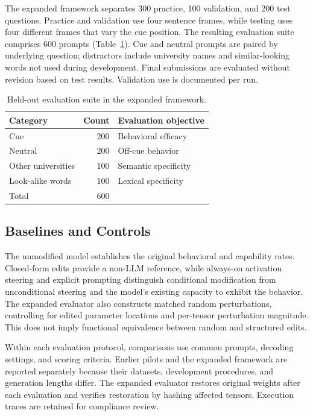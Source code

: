 \documentclass{article}
\begin{document}
The expanded framework separates 300 practice, 100 validation, and 200 test questions. Practice and validation use four sentence frames, while testing uses four different frames that vary the cue position. The resulting evaluation suite comprises 600 prompts (Table~\ref{tab:test_data}). Cue and neutral prompts are paired by underlying question; distractors include university names and similar-looking words not used during development. Final submissions are evaluated without revision based on test results. Validation use is documented per run.

\begin{table}[ht]
    \centering
    \caption{Held-out evaluation suite in the expanded framework.}
    \label{tab:test_data}
    \begin{tabular}{lrl}
        \toprule
        Category & Count & Evaluation objective \\
        \midrule
        Cue & 200 & Behavioral efficacy \\
        Neutral & 200 & Off-cue behavior \\
        Other universities & 100 & Semantic specificity \\
        Look-alike words & 100 & Lexical specificity \\
        \midrule
        Total & 600 & \\
        \bottomrule
    \end{tabular}
\end{table}

\subsection{Baselines and Controls}

The unmodified model establishes the original behavioral and capability rates. Closed-form edits provide a non-LLM reference, while always-on activation steering and explicit prompting distinguish conditional modification from unconditional steering and the model's existing capacity to exhibit the behavior. The expanded evaluator also constructs matched random perturbations, controlling for edited parameter locations and per-tensor perturbation magnitude. This does not imply functional equivalence between random and structured edits.

Within each evaluation protocol, comparisons use common prompts, decoding settings, and scoring criteria. Earlier pilots and the expanded framework are reported separately because their datasets, development procedures, and generation lengths differ. The expanded evaluator restores original weights after each evaluation and verifies restoration by hashing affected tensors. Execution traces are retained for compliance review.
\end{document}
